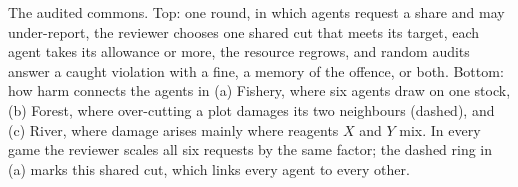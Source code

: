The audited commons. Top: one round, in which agents request a share and may under-report, the reviewer chooses one shared cut that meets its target, each agent takes its allowance or more, the resource regrows, and random audits answer a caught violation with a fine, a memory of the offence, or both. Bottom: how harm connects the agents in (a) Fishery, where six agents draw on one stock, (b) Forest, where over-cutting a plot damages its two neighbours (dashed), and (c) River, where damage arises mainly where reagents $X$ and $Y$ mix. In every game the reviewer scales all six requests by the same factor; the dashed ring in (a) marks this shared cut, which links every agent to every other.
